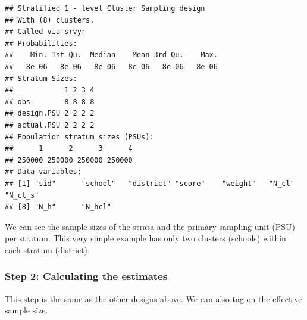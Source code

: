 \documentclass[
]{article}
\newenvironment{Shaded}{\begin{snugshade}}{\end{snugshade}}
\newcommand{\CommentTok}[1]{\textcolor[rgb]{0.56,0.35,0.01}{\textit{#1}}}
\newcommand{\DataTypeTok}[1]{\textcolor[rgb]{0.13,0.29,0.53}{#1}}
\newcommand{\KeywordTok}[1]{\textcolor[rgb]{0.13,0.29,0.53}{\textbf{#1}}}
\newcommand{\NormalTok}[1]{#1}
\newcommand{\OperatorTok}[1]{\textcolor[rgb]{0.81,0.36,0.00}{\textbf{#1}}}
\newcommand{\OtherTok}[1]{\textcolor[rgb]{0.56,0.35,0.01}{#1}}
\newcommand{\StringTok}[1]{\textcolor[rgb]{0.31,0.60,0.02}{#1}}
\begin{document}
\begin{Shaded}
\end{Shaded}

\begin{verbatim}
## Stratified 1 - level Cluster Sampling design
## With (8) clusters.
## Called via srvyr
## Probabilities:
##    Min. 1st Qu.  Median    Mean 3rd Qu.    Max. 
##   8e-06   8e-06   8e-06   8e-06   8e-06   8e-06 
## Stratum Sizes: 
##            1 2 3 4
## obs        8 8 8 8
## design.PSU 2 2 2 2
## actual.PSU 2 2 2 2
## Population stratum sizes (PSUs): 
##      1      2      3      4 
## 250000 250000 250000 250000 
## Data variables:
## [1] "sid"      "school"   "district" "score"    "weight"   "N_cl"     "N_cl_s"  
## [8] "N_h"      "N_hcl"
\end{verbatim}

We can see the sample sizes of the strata and the primary sampling unit (PSU) per stratum. This very simple example has only two clusters (schools) within each stratum (district).

\hypertarget{step-2-calculating-the-estimates-2}{%
\subsubsection{Step 2: Calculating the estimates}\label{step-2-calculating-the-estimates-2}}

This step is the same as the other designs above. We can also tag on the effective sample size.

\begin{Shaded}
\end{Shaded}
\end{document}
